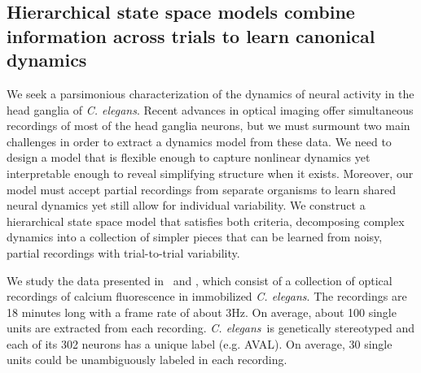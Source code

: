 \documentclass[11pt]{article}
\newcommand{\celegans}{\textit{C. elegans}}
\begin{document}
\subsection*{Hierarchical state space models combine information across
  trials to learn canonical dynamics}


We seek a parsimonious characterization of the dynamics of neural
activity in the head ganglia of \celegans. Recent advances in optical
imaging offer simultaneous recordings of most of the head ganglia
neurons, but we must surmount two main challenges in order to extract
a dynamics model from these data.  We need to design a model that is
flexible enough to capture nonlinear dynamics yet interpretable enough
to reveal simplifying structure when it exists. Moreover, our model
must accept partial recordings from separate organisms to learn shared
neural dynamics yet still allow for individual variability. We
construct a hierarchical state space model that satisfies both
criteria, decomposing complex dynamics into a collection of simpler
pieces that can be learned from noisy, partial recordings with
trial-to-trial variability.

We study the data presented in~\citet{kato2015global} and
\citet{nichols2017global}, which consist of a collection of optical
recordings of calcium fluorescence in immobilized \celegans. The
recordings are 18 minutes long with a frame rate of about 3Hz.  On
average, about 100 single units are extracted from each
recording. \celegans~is genetically stereotyped and each of its 302
neurons has a unique label (e.g. \textsf{AVAL}). On average, 30 single
units could be unambiguously labeled in each recording.
\end{document}
